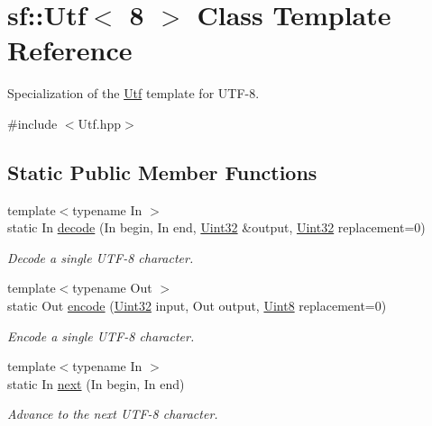 \hypertarget{classsf_1_1_utf_3_018_01_4}{\section{sf\-:\-:Utf$<$ 8 $>$ Class Template Reference}
\label{classsf_1_1_utf_3_018_01_4}
}


Specialization of the \hyperlink{classsf_1_1_utf}{Utf} template for U\-T\-F-\/8.  




{\ttfamily \#include $<$Utf.\-hpp$>$}

\subsection*{Static Public Member Functions}
\begin{DoxyCompactItemize}
\item 
{\footnotesize template$<$typename In $>$ }\\static In \hyperlink{classsf_1_1_utf_3_018_01_4_a59d4e8d5832961e62b263d308b72bf4b}{decode} (In begin, In end, \hyperlink{namespacesf_aa746fb1ddef4410bddf198ebb27e727c}{Uint32} \&output, \hyperlink{namespacesf_aa746fb1ddef4410bddf198ebb27e727c}{Uint32} replacement=0)
\begin{DoxyCompactList}\small\item\em Decode a single U\-T\-F-\/8 character. \end{DoxyCompactList}\item 
{\footnotesize template$<$typename Out $>$ }\\static Out \hyperlink{classsf_1_1_utf_3_018_01_4_a5fbc6b5a996f52e9e4a14633d0d71847}{encode} (\hyperlink{namespacesf_aa746fb1ddef4410bddf198ebb27e727c}{Uint32} input, Out output, \hyperlink{namespacesf_a4ef3d630785c4f296f9b4f274c33d78e}{Uint8} replacement=0)
\begin{DoxyCompactList}\small\item\em Encode a single U\-T\-F-\/8 character. \end{DoxyCompactList}\item 
{\footnotesize template$<$typename In $>$ }\\static In \hyperlink{classsf_1_1_utf_3_018_01_4_a0365a0b38700baa161843563d083edf6}{next} (In begin, In end)
\begin{DoxyCompactList}\small\item\em Advance to the next U\-T\-F-\/8 character. \end{DoxyCompactList}\item 

\end{DoxyCompactItemize}
